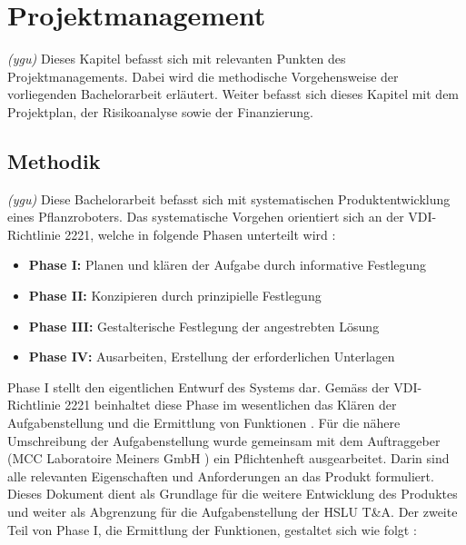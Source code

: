 \newpage
\section{Projektmanagement}
\textit{(ygu)} Dieses Kapitel befasst sich mit relevanten Punkten des Projektmanagements. Dabei wird die methodische Vorgehensweise der vorliegenden Bachelorarbeit erläutert. Weiter befasst sich dieses Kapitel mit dem Projektplan, der Risikoanalyse sowie der Finanzierung. 
\subsection{Methodik}
\label{methodik}
\textit{(ygu)} Diese Bachelorarbeit befasst sich mit systematischen Produktentwicklung eines Pflanzroboters. Das systematische Vorgehen orientiert sich  an der VDI-Richtlinie 2221, welche in folgende Phasen unterteilt wird \cite{naefe}:

\begin{itemize}
	\item \textbf{Phase I:} Planen und klären der Aufgabe durch informative Festlegung
	
	\item \textbf{Phase II:} Konzipieren durch prinzipielle Festlegung
	
	\item \textbf{Phase III:} Gestalterische Festlegung der angestrebten Lösung
	
	\item \textbf{Phase IV:} Ausarbeiten, Erstellung der erforderlichen Unterlagen
	
\end{itemize}

Phase I stellt den eigentlichen Entwurf des Systems dar. Gemäss der VDI-Richtlinie 2221 beinhaltet diese Phase im wesentlichen das Klären der Aufgabenstellung und die Ermittlung von Funktionen \cite{vdi2221}. Für die nähere Umschreibung der Aufgabenstellung wurde gemeinsam mit dem Auftraggeber (MCC Laboratoire Meiners GmbH ) ein Pflichtenheft ausgearbeitet. Darin sind alle relevanten Eigenschaften und Anforderungen an das Produkt formuliert. Dieses Dokument dient als Grundlage für die weitere Entwicklung des Produktes und weiter als Abgrenzung für die Aufgabenstellung der HSLU T\&A. Der zweite Teil von Phase I, die Ermittlung der Funktionen, gestaltet sich wie folgt \cite{pahl}:

